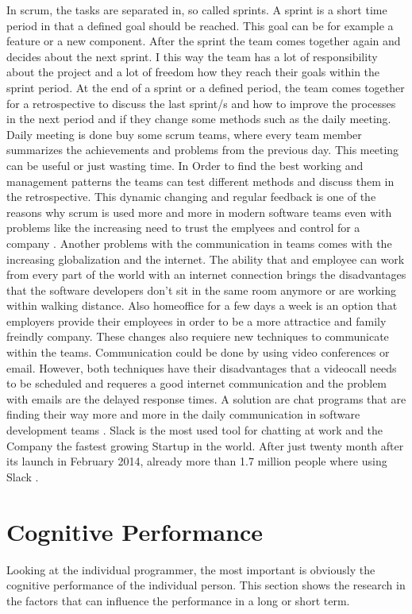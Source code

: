 In scrum, the tasks are separated in, so called sprints. A sprint is a short time period in that a defined goal should be reached. This goal can be for example a feature or a new component. After the sprint the team comes together again and decides about the next sprint. I this way the team has a lot of responsibility about the project and a lot of freedom how they reach their goals within the sprint period. At the end of a sprint or a defined period, the team comes together for a retrospective to discuss the last sprint/s and how to improve the processes in the next period and if they change some methods such as the daily meeting. Daily meeting is done buy some scrum teams, where every team member summarizes the achievements and problems from the previous day. This meeting can be useful or just wasting time. In Order to find the best working and management patterns the teams can test different methods and discuss them in the retrospective. This dynamic changing and regular feedback is one of the reasons why scrum is used more and more in modern software teams \cite{rising2000scrum} \cite{moe2010teamwork} even with problems like the increasing need to trust the emplyees and control for a company \cite{ramesh2006can}.
\bigbreak
Another problems with the communication in teams comes with the increasing globalization and the internet. The ability that and employee can work from every part of the world with an internet connection brings the disadvantages that the software developers don't sit in the same room anymore or are working within walking distance. Also homeoffice for a few days a week is an option that employers provide their employees in order to be a more attractice and family freindly company. These changes also requiere new techniques to communicate within the teams. Communication could be done by using video conferences or email. However, both techniques have their disadvantages that a videocall needs to be scheduled and requeres a good internet communication and the problem with emails are the delayed response times. \cite{carmel1999global}
A solution are chat programs that are finding their way more and more in the daily communication in software development teams \cite{jarvenpaa1998communication}. Slack is the most used tool for chatting at work and the Company the fastest growing Startup in the world. After just twenty month after its launch in February 2014, already more than 1.7 million people where using Slack  \cite{bercovici2015}.

\section{Cognitive Performance}
Looking at the individual programmer, the most important is obviously the cognitive performance of the individual person. This section shows the research in the factors that can influence the performance in a long or short term. 

